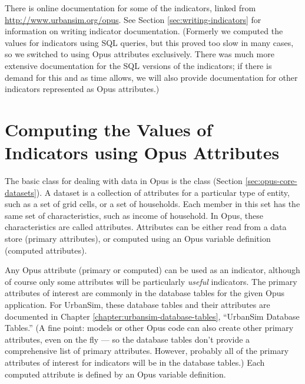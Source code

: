 There is online documentation for some of the indicators, 
linked from \url{http://www.urbansim.org/opus}.  See Section
\ref{sec:writing-indicators} for information on writing indicator
\indicatorsindex documentation.  (Formerly we computed the values for
indicators using SQL queries, but this proved too slow in many cases, so we
switched to using Opus attributes exclusively.  There was much more
extensive documentation for the SQL versions of the indicators; if there is
demand for this and as time allows, we will also provide documentation for
other indicators represented as Opus attributes.)

\section{Computing the Values of Indicators using Opus Attributes}

The basic class for dealing with data in Opus is the class 
\datasetindex (Section \ref{sec:opus-core-datasets}).  A dataset
\datasetindex is a collection of attributes \attributesindex for a
particular type of entity, such as a set of grid cells, or a set of
households.  Each member in this set has the same set of characteristics,
such as income of household.  In Opus, these characteristics are called
attributes. \attributesindex Attributes \attributesindex can be either read
from a data store (primary attributes), \primaryattributesindex or computed
using an Opus variable definition (computed
attributes). \computedattributesindex

Any Opus attribute \attributesindex (primary or computed)
\computedattributesindex\primaryattributesindex can be used as an
indicator, \indicatorsindex although of course only some attributes
\attributesindex will be particularly \emph{useful}
indicators. \indicatorsindex The primary attributes \primaryattributesindex
of interest are commonly in the database tables for the given Opus
application.  For UrbanSim, these database tables and their attributes
\attributesindex are documented in Chapter
\ref{chapter:urbansim-database-tables}, ``UrbanSim Database Tables.''  (A
fine point: models or other Opus code can also create other primary
attributes, \primaryattributesindex even on the fly --- so the database
tables don't provide a comprehensive list of primary
attributes. \primaryattributesindex However, probably all of the primary
attributes \primaryattributesindex of interest for indicators
\indicatorsindex will be in the database tables.)  Each computed attribute
\computedattributesindex is defined by an Opus variable \variablesindex
definition.

